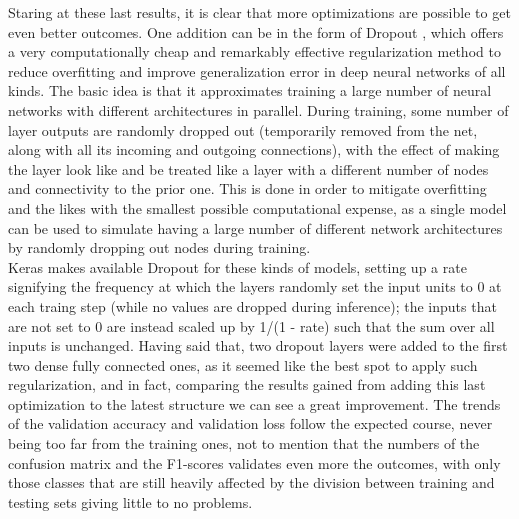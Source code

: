 \documentclass[12pt,a4paper]{report}
\begin{document}
Staring at these last results, it is clear that more optimizations are possible to get even better outcomes. One addition can be in the form of Dropout \cite{dropout}, which offers a very computationally cheap and remarkably effective regularization method to reduce overfitting and improve generalization error in deep neural networks of all kinds. The basic idea is that it approximates training a large number of neural networks with different architectures in parallel. During training, some number of layer outputs are randomly dropped out (temporarily removed from the net, along with all its incoming and outgoing connections), with the effect of making the layer look like and be treated like a layer with a different number of nodes and connectivity to the prior one. This is done in order to mitigate overfitting and the likes with the smallest possible computational expense, as a single model can be used to simulate having a large number of different network architectures by randomly dropping out nodes during training. \\
Keras makes available Dropout for these kinds of models, setting up a rate signifying the frequency at which the layers randomly set the input units to 0 at each traing step (while no values are dropped during inference); the inputs that are not set to 0 are instead scaled up by 1/(1 - rate) such that the sum over all inputs is unchanged. Having said that, two dropout layers were added to the first two dense fully connected ones, as it seemed like the best spot to apply such regularization, and in fact, comparing the results gained from adding this last optimization to the latest structure we can see a great improvement. The trends of the validation accuracy and validation loss follow the expected course, never being too far from the training ones, not to mention that the numbers of the confusion matrix and the F1-scores validates even more the outcomes, with only those classes that are still heavily affected by the division between training and testing sets giving little to no problems.
\end{document}
